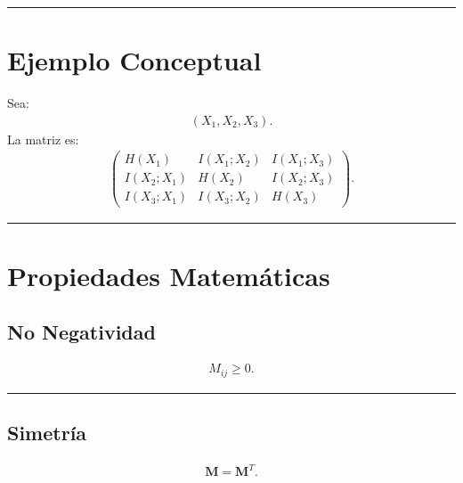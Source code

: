 \documentclass[letterpaper,10pt,english]{jupyterBook}
\begin{document}
\bigskip\hrule\bigskip



\section{Ejemplo Conceptual}
\label{\detokenize{03_multivariate_models/mi_matrix:ejemplo-conceptual}}
\sphinxAtStartPar
Sea:
\begin{equation*}
\begin{split}
(X_1,X_2,X_3).
\end{split}
\end{equation*}
\sphinxAtStartPar
La matriz es:
\begin{equation*}
\begin{split}
\begin{pmatrix}
H(X_1) & I(X_1;X_2) & I(X_1;X_3) \\
I(X_2;X_1) & H(X_2) & I(X_2;X_3) \\
I(X_3;X_1) & I(X_3;X_2) & H(X_3)
\end{pmatrix}.
\end{split}
\end{equation*}

\bigskip\hrule\bigskip



\section{Propiedades Matemáticas}
\label{\detokenize{03_multivariate_models/mi_matrix:propiedades-matematicas}}

\subsection{No Negatividad}
\label{\detokenize{03_multivariate_models/mi_matrix:no-negatividad}}\begin{equation*}
\begin{split}
M_{ij}\ge 0.
\end{split}
\end{equation*}

\bigskip\hrule\bigskip



\subsection{Simetría}
\label{\detokenize{03_multivariate_models/mi_matrix:id1}}\begin{equation*}
\begin{split}
\mathbf{M}=\mathbf{M}^T.
\end{split}
\end{equation*}
\end{document}
